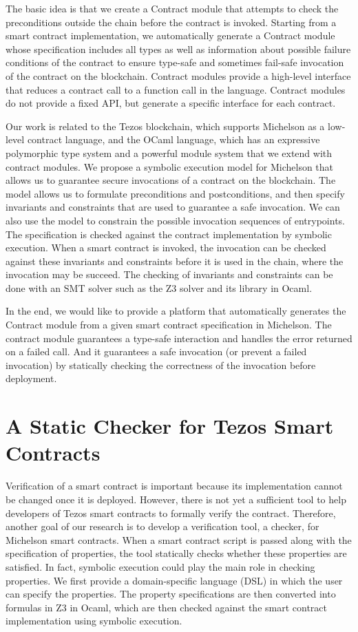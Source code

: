 \documentclass[a4paper,11pt]{article}
\begin{document}
The basic idea is that we create a Contract module that attempts to check the preconditions outside the chain before the contract is invoked. Starting from a smart contract implementation, we automatically generate a Contract module whose specification includes all types as well as information about possible failure conditions of the contract to ensure type-safe and sometimes fail-safe invocation of the contract on the blockchain. Contract modules provide a high-level interface that reduces a contract call to a function call in the language. Contract modules do not provide a fixed API, but generate a specific interface for each contract.

Our work is related to the Tezos blockchain, which supports Michelson as a low-level contract language, and the OCaml language, which has an expressive polymorphic type system and a powerful module system that we extend with contract modules. We propose a symbolic execution model for Michelson that allows us to guarantee secure invocations of a contract on the blockchain. The model allows us to formulate preconditions and postconditions, and then specify invariants and constraints that are used to guarantee a safe invocation. We can also use the model to constrain the possible invocation sequences of entrypoints. The specification is checked against the contract implementation by symbolic execution. When a smart contract is invoked, the invocation can be checked against these invariants and constraints before it is used in the chain, where the invocation may be succeed. The checking of invariants and constraints can be done with an SMT solver such as the Z3 solver and its library in Ocaml. 

In the end, we would like to provide a platform that automatically generates the Contract module from a given smart contract specification in Michelson. The contract module guarantees a type-safe interaction and handles the error returned on a failed call. And it guarantees a safe invocation (or prevent a failed invocation) by statically checking the correctness of the invocation before deployment.
\section{A Static Checker for Tezos Smart Contracts}
\label{sec:static-checker}
Verification of a smart contract is important because its implementation cannot be changed once it is deployed. However, there is not yet a sufficient tool to help developers of Tezos smart contracts to formally verify the contract. Therefore, another goal of our research is to develop a verification tool, a checker, for Michelson smart contracts. When a smart contract script is passed along with the specification of properties, the tool statically checks whether these properties are satisfied. In fact, symbolic execution could play the main role in checking properties. We first provide a domain-specific language (DSL) in which the user can specify the properties. The property specifications are then converted into formulas in Z3 in Ocaml, which are then checked against the smart contract implementation using symbolic execution.
\end{document}

